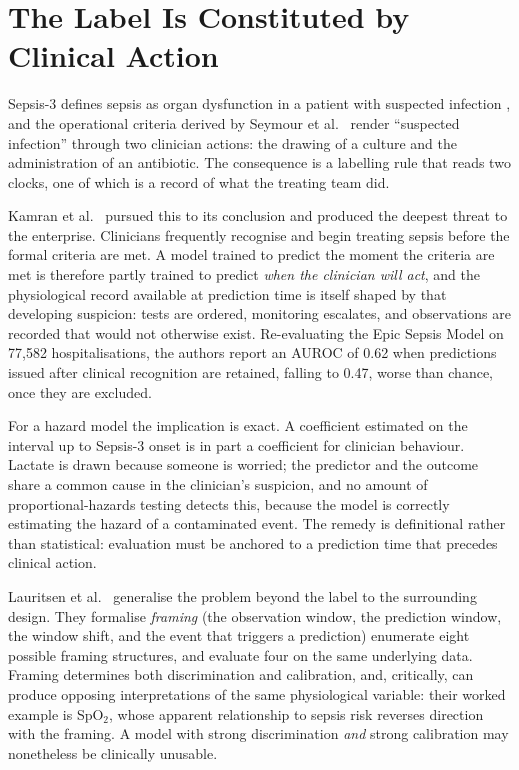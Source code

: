 \section{The Label Is Constituted by Clinical Action}
\label{sec:label_action}

Sepsis-3 defines sepsis as organ dysfunction in a patient with suspected
infection \cite{singer2016sepsis3}, and the operational criteria derived by
Seymour et al.\ \cite{seymour2016assessment} render ``suspected infection''
through two clinician actions: the drawing of a culture and the administration
of an antibiotic. The consequence is a labelling rule that reads two clocks,
one of which is a record of what the treating team did.

Kamran et al.\ \cite{kamran2024evaluation} pursued this to its conclusion and
produced the deepest threat to the enterprise. Clinicians frequently recognise
and begin treating sepsis before the formal criteria are met. A model trained
to predict the moment the criteria are met is therefore partly trained to
predict \emph{when the clinician will act}, and the physiological record
available at prediction time is itself shaped by that developing suspicion:
tests are ordered, monitoring escalates, and observations are recorded that
would not otherwise exist. Re-evaluating the Epic Sepsis Model on 77,582
hospitalisations, the authors report an AUROC of 0.62 when predictions issued
after clinical recognition are retained, falling to 0.47, worse than chance, once they are excluded.

For a hazard model the implication is exact. A coefficient estimated on the
interval up to Sepsis-3 onset is in part a coefficient for clinician behaviour.
Lactate is drawn because someone is worried; the predictor and the outcome
share a common cause in the clinician's suspicion, and no amount of
proportional-hazards testing detects this, because the model is correctly
estimating the hazard of a contaminated event. The remedy is definitional
rather than statistical: evaluation must be anchored to a prediction time that
precedes clinical action.

Lauritsen et al.\ \cite{lauritsen2021framing} generalise the problem beyond the
label to the surrounding design. They formalise \emph{framing} (the
observation window, the prediction window, the window shift, and the event that
triggers a prediction) enumerate eight possible framing structures, and
evaluate four on the same underlying data. Framing determines both
discrimination and calibration, and, critically, can produce opposing
interpretations of the same physiological variable: their worked example is
SpO$_2$, whose apparent relationship to sepsis risk reverses direction with the
framing. A model with strong discrimination \emph{and} strong calibration may
nonetheless be clinically unusable.

